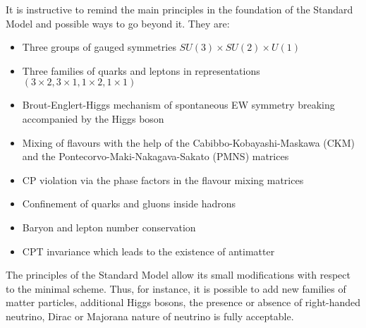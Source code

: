 \documentclass{cernyrep}
\begin{document}
It is instructive to remind the main principles in the foundation of the Standard Model and possible ways to go beyond it. They are:
\begin{itemize}
\item  Three groups of gauged symmetries $SU(3)\times SU(2)\times U(1)$
\item  Three families of quarks and leptons in representations  $(3\times 2, 3\times 1, 1\times 2, 1\times 1)$
\item  Brout-Englert-Higgs mechanism of spontaneous EW symmetry breaking accompanied by the Higgs boson
\item  Mixing of flavours with the help of the Cabibbo-Kobayashi-Maskawa (CKM) and the Pontecorvo-Maki-Nakagava-Sakato (PMNS)  matrices
\item  CP violation via the phase factors in the flavour mixing matrices
\item Confinement of quarks and gluons inside hadrons
\item Baryon and lepton number conservation
\item CPT invariance which leads to the existence of antimatter
\end{itemize}

The principles of the Standard Model allow its small modifications with respect  to the minimal scheme. Thus, for instance, it is possible to add new families of matter particles, additional Higgs bosons, the presence or absence of right-handed neutrino, Dirac or  Majorana nature of neutrino
is fully acceptable.
\end{document}
